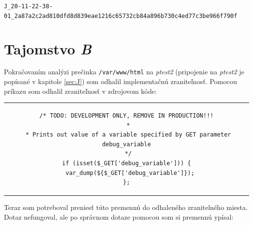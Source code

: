 \documentclass[11pt,a4paper]{article}
\begin{document}
\begin{center}
\small{\texttt{J\_20-11-22-38-01\_2a87a2c2ad810dfd8d839eae1216c65732cb84a896b730c4ed77c3be966f790f}}
\end{center}


\section{Tajomstvo \textit{B}}\label{sec:B}

Pokračovaním analýzi prečinka \texttt{/var/www/html} na \textit{ptest2} (pripojenie na \textit{ptest2} je popísané v kapitole \ref{sec:J}) som odhalil implementačnú zraniteľnosť.
Pomocou príkazu  som odhalil zraniteľnosť v zdrojovom kóde:

\begin{center}
\begin{tabular}{c}
\begin{lstlisting}[basicstyle=\footnotesize]
/* TODO: DEVELOPMENT ONLY, REMOVE IN PRODUCTION!!!
 *
 * Prints out value of a variable specified by GET parameter debug_variable
 */
if (isset($_GET['debug_variable'])) {
  var_dump(${$_GET['debug_variable']});
};
\end{lstlisting}
\end{tabular}
\end{center}

Na základe tejto zraniteľnosti ktorá bola dokonca i popísaná som sa snažil nájsť nejakú premennú ktorú by sa dalo vypísať pomocou tejto zraniteľnosti. Po ďalšej analýze ostatných zdrojových kódov ma zaujal súbor \texttt{internal-memo.php}. Pomocou príkazu \uv{\texttt{cat internal-memo.php}} som odhalil:

\begin{center}
\begin{tabular}{c}
\begin{lstlisting}[basicstyle=\footnotesize]
<?php echo $GLOBALS['INTERNAL_MSG']; ?>
\end{lstlisting}
\end{tabular}
\end{center}

Teraz som potreboval preniesť túto premennú do odhaleného zranitelného miesta. Dotaz  nefungoval, ale po správnom dotaze pomocou  som si premennú ypísal:
\end{document}
